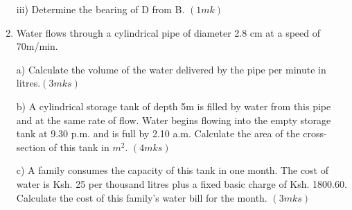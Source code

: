 \documentclass[
  a4paperpaper,
]{scrbook}
\begin{document}
\begin{tcolorbox}
\begin{enumerate}
  iii) Determine the bearing of D from B. \((1mk)\)
\item
  Water flows through a cylindrical pipe of diameter 2.8 cm at a speed
  of 70m/min.

  a) Calculate the volume of the water delivered by the pipe per minute
  in litres.\((3mks)\)

  b) A cylindrical storage tank of depth 5m is filled by water from this
  pipe and at the same rate of flow. Water begins flowing into the empty
  storage tank at 9.30 p.m. and is full by 2.10 a.m. Calculate the area
  of the cross-section of this tank in \(m^2\). \((4mks)\)

  c) A family consumes the capacity of this tank in one month. The cost
  of water is Ksh. 25 per thousand litres plus a fixed basic charge of
  Ksh. 1800.60. Calculate the cost of this family's water bill for the
  month. \((3mks)\)
\end{enumerate}

\end{tcolorbox}
\end{document}
